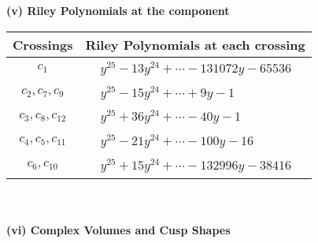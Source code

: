 \documentclass[1p]{elsarticle_modified}
\theoremstyle{definition}
\begin{document}
\newpage\renewcommand{\arraystretch}{1}
\flushleft \textbf{(v) Riley Polynomials at the component}\newline \\
\begin{tabular}{m{50pt}|m{274pt}}
Crossings & \hspace{64pt}Riley Polynomials at each crossing \\
\hline $$\begin{aligned}c_{1}\end{aligned}$$&$\begin{aligned}
&y^{25}-13 y^{24}+\cdots-131072 y-65536
\end{aligned}$\\
\hline $$\begin{aligned}c_{2},c_{7},c_{9}\end{aligned}$$&$\begin{aligned}
&y^{25}-15 y^{24}+\cdots+9 y-1
\end{aligned}$\\
\hline $$\begin{aligned}c_{3},c_{8},c_{12}\end{aligned}$$&$\begin{aligned}
&y^{25}+36 y^{24}+\cdots-40 y-1
\end{aligned}$\\
\hline $$\begin{aligned}c_{4},c_{5},c_{11}\end{aligned}$$&$\begin{aligned}
&y^{25}-21 y^{24}+\cdots-100 y-16
\end{aligned}$\\
\hline $$\begin{aligned}c_{6},c_{10}\end{aligned}$$&$\begin{aligned}
&y^{25}+15 y^{24}+\cdots-132996 y-38416
\end{aligned}$\\
\hline
\end{tabular}\\~\\
\newpage\flushleft \textbf{(vi) Complex Volumes and Cusp Shapes}
\end{document}
